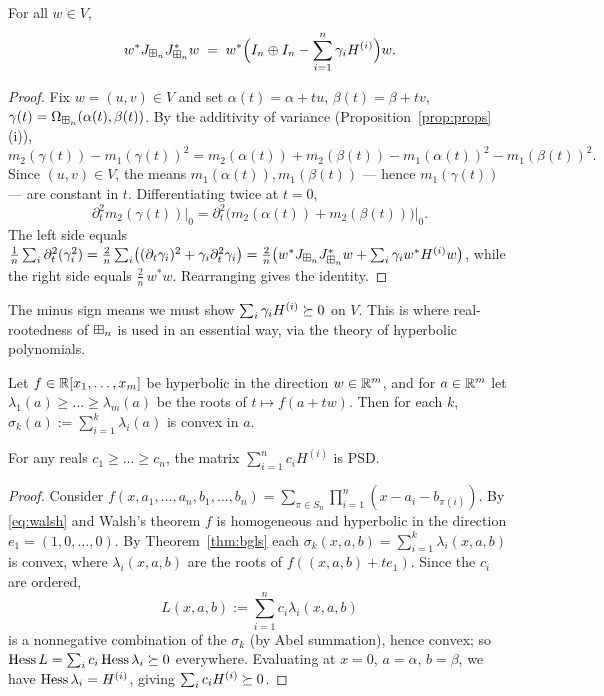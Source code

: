 \documentclass[11pt]{article}
\begin{document}
\begin{qfourlemma}\label{lem:hess}
For all $w\in V$,
\[
w^\ast J_{\boxplus_n}J_{\boxplus_n}^\ast w
\;=\;w^\ast\Bigl(I_n\oplus I_n-\sum_{i=1}^n\gamma_i H^{(i)}\Bigr)w.
\]
\end{qfourlemma}

\begin{proof}
Fix $w=(u,v)\in V$ and set $\alpha(t)=\alpha+tu$, $\beta(t)=\beta+tv$,
$\gamma(t)=\Omega_{\boxplus_n}(\alpha(t),\beta(t))$. By the additivity of variance
(Proposition~\ref{prop:props}(i)),
\[
m_2(\gamma(t))-m_1(\gamma(t))^2
=m_2(\alpha(t))+m_2(\beta(t))-m_1(\alpha(t))^2-m_1(\beta(t))^2 .
\]
Since $(u,v)\in V$, the means $m_1(\alpha(t)),m_1(\beta(t))$ — hence
$m_1(\gamma(t))$ — are constant in $t$. Differentiating twice at $t=0$,
\[
\partial_t^2 m_2(\gamma(t))\big|_0=\partial_t^2\bigl(m_2(\alpha(t))+m_2(\beta(t))\bigr)\big|_0 .
\]
The left side equals
$\tfrac1n\sum_i\partial_t^2(\gamma_i^2)
=\tfrac2n\sum_i\bigl((\partial_t\gamma_i)^2+\gamma_i\partial_t^2\gamma_i\bigr)
=\tfrac2n\bigl(w^\ast J_{\boxplus_n}J_{\boxplus_n}^\ast w+\sum_i\gamma_i w^\ast H^{(i)}w\bigr)$,
while the right side equals $\tfrac2n\,w^\ast w$. Rearranging gives the
identity.
\end{proof}

The minus sign means we must show $\sum_i\gamma_i H^{(i)}\succeq 0$ on $V$. This is
where real-rootedness of $\boxplus_n$ is used in an essential way, via the theory of
hyperbolic polynomials.

\begin{qfourtheorem}\label{thm:bgls}
Let $f\in\mathbb{R}[x_1,\dots,x_m]$ be hyperbolic in the direction $w\in\mathbb{R}^m$, and for
$a\in\mathbb{R}^m$ let $\lambda_1(a)\ge\dots\ge\lambda_m(a)$ be the roots of
$t\mapsto f(a+tw)$. Then for each $k$, $\sigma_k(a):=\sum_{i=1}^k\lambda_i(a)$ is
convex in $a$.
\end{qfourtheorem}

\begin{qfourcorollary}\label{cor:psd}
For any reals $c_1\ge\dots\ge c_n$, the matrix $\sum_{i=1}^n c_i H^{(i)}$ is PSD.
\end{qfourcorollary}

\begin{proof}
Consider $f(x,a_1,\dots,a_n,b_1,\dots,b_n)=\sum_{\pi\in S_n}\prod_{i=1}^n
(x-a_i-b_{\pi(i)})$. By \eqref{eq:walsh} and Walsh's theorem $f$ is homogeneous
and hyperbolic in the direction $e_1=(1,0,\dots,0)$. By Theorem~\ref{thm:bgls}
each $\sigma_k(x,a,b)=\sum_{i=1}^k\lambda_i(x,a,b)$ is convex, where
$\lambda_i(x,a,b)$ are the roots of $f((x,a,b)+te_1)$. Since the $c_i$ are
ordered,
\[
L(x,a,b):=\sum_{i=1}^n c_i\lambda_i(x,a,b)
\]
is a nonnegative combination of the $\sigma_k$ (by Abel summation), hence convex;
so $\operatorname{Hess} L=\sum_i c_i\operatorname{Hess}\lambda_i\succeq 0$ everywhere. Evaluating at $x=0$,
$a=\alpha$, $b=\beta$, we have $\operatorname{Hess}\lambda_i=H^{(i)}$, giving
$\sum_i c_i H^{(i)}\succeq 0$.
\end{proof}
\end{document}
